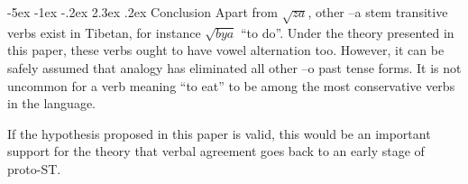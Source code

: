 \documentclass[oldfontcommands,twoside,a4paper,12pt]{memoir}
\makeatletter
\newcommand{\racine}[1]{\begin{math}\sqrt{#1}\end{math}}
\renewcommand\section{\@startsection{section}{0}{\z@}%
                                   {-5ex \@plus -1ex \@minus -.2ex}%
                                   {2.3ex \@plus.2ex}%
                                   {\flushleft\large\bfseries}}
\renewcommand{\subsection}{\@startsection{subsection}{1}{\z@}
                                   {-2.5ex \@plus -1ex \@minus -.2ex}%
                                   {2.3ex \@plus.2ex}%
								{\flushleft\scshape\bfseries} }
\makeatother
\begin{document}
\section{Conclusion}
Apart from \racine{za}, other --a stem transitive verbs exist in Tibetan, for instance \racine{bya} ``to do''. Under the theory presented in this paper, these verbs ought to have vowel alternation too. However, it can be safely assumed that analogy has eliminated all other --o past tense forms.  It is not uncommon for a verb meaning ``to eat'' to be among the most conservative verbs in the language. 

If the hypothesis proposed in this paper is valid, this would be an important support for the theory that verbal agreement goes back to an early stage of proto-ST.

\renewcommand{\bibname}{\textsc{References}}
\makeatletter
\renewcommand\bibsection%
{
  \subsection*{\refname
    \@mkboth{\MakeUppercase{\refname}}{\MakeUppercase{\refname}}}
}
\makeatother
\vspace{24pt}
\setlength{\bibhang}{18pt}
\setlength{\bibsep}{2pt}


\end{document}
